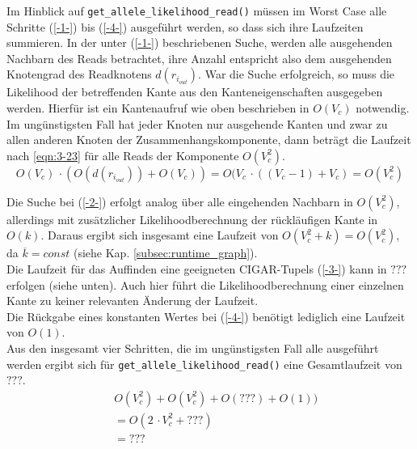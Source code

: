 Im Hinblick auf \lstinline|get_allele_likelihood_read()| müssen im Worst Case alle Schritte (\ref{-1-}) bis (\ref{-4-}) ausgeführt werden, so dass sich ihre Laufzeiten summieren. In der unter (\ref{-1-}) beschriebenen Suche, werden alle ausgehenden Nachbarn des Reads betrachtet, ihre Anzahl entspricht also dem ausgehenden Knotengrad des Readknotens $d(r_{i_{out}})$. War die Suche erfolgreich, so muss die Likelihood der betreffenden Kante aus den Kanteneigenschaften ausgegeben werden. Hierfür ist ein Kantenaufruf wie oben beschrieben in $ O(V_{c}) $ notwendig. Im ungünstigsten Fall hat jeder Knoten nur ausgehende Kanten und zwar zu allen anderen Knoten der Zusammenhangskomponente, dann beträgt die Laufzeit nach \eqref{eqn:3-23} für alle Reads der Komponente $ O(V_{c}^2)$.
\begin{equation} \label{eqn:3-23}
\tag{3-23}
O(V_{c}) \, \cdotp (O(d(r_{i_{out}})) +  O(V_{c})) = O(V_{c} \, \cdotp ((V_{c}-1) + V_{c})  = O(V_{c}^2)
\end{equation} 

Die Suche bei (\ref{-2-}) erfolgt analog über alle eingehenden Nachbarn in $ O(V_{c}^2)$, allerdings mit zusätzlicher Likelihoodberechnung der rückläufigen Kante in $O(k)$. Daraus ergibt sich insgesamt eine Laufzeit von $ O(V_{c}^2 +k) = O(V_{c}^2)$, da $\overline{k}=const$ (siehe Kap. \ref{subsec:runtime_graph}).\\
Die Laufzeit für das Auffinden eine geeigneten CIGAR-Tupels (\ref{-3-}) kann in $???$ erfolgen (siehe unten). Auch hier führt die Likelihoodberechnung einer einzelnen Kante zu keiner relevanten Änderung der Laufzeit.\\

Die Rückgabe eines konstanten Wertes bei (\ref{-4-}) benötigt lediglich eine Laufzeit von $ O(1) $.\\

Aus den insgesamt vier Schritten, die im ungünstigsten Fall alle ausgeführt werden ergibt sich für \lstinline|get_allele_likelihood_read()| eine Gesamtlaufzeit von $???$. \\
\begin{equation} \label{eqn:3-xxx1}
\tag{3-xxx1}
\begin{aligned}
&\ {} O(V_{c}^2) + O(V_{c}^2) + O(???) + O(1))  \\
& \ = O(2 \, \cdotp V_{c}^2 + ??? )\\
&\ = ???\\
\end{aligned}
\end{equation}

